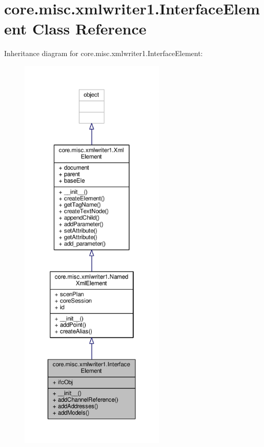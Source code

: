 \hypertarget{classcore_1_1misc_1_1xmlwriter1_1_1_interface_element}{\section{core.\+misc.\+xmlwriter1.\+Interface\+Element Class Reference}
\label{classcore_1_1misc_1_1xmlwriter1_1_1_interface_element}
}


Inheritance diagram for core.\+misc.\+xmlwriter1.\+Interface\+Element\+:
\nopagebreak
\begin{figure}[H]
\begin{center}
\leavevmode
\includegraphics[height=550pt]{classcore_1_1misc_1_1xmlwriter1_1_1_interface_element__inherit__graph}
\end{center}
\end{figure}


